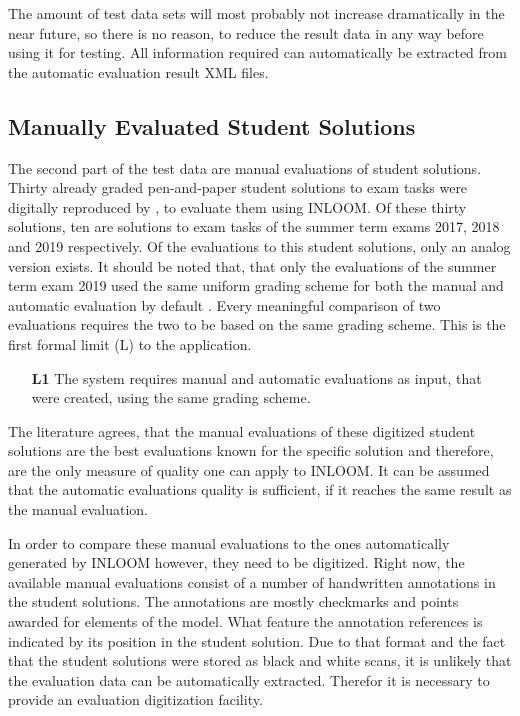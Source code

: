 The amount of test data sets will most probably not increase dramatically in the near future,
so there is no reason, to reduce the result data in any way before using it for testing. All
information required can automatically be extracted from the automatic evaluation result XML 
files.



\subsection{Manually Evaluated Student Solutions}

The second part of the test data are manual evaluations of student solutions. Thirty already
graded pen-and-paper student solutions to exam tasks were digitally reproduced by \cite{1}, to 
evaluate them using INLOOM. Of these thirty solutions, ten are solutions to exam tasks of the
summer term exams 2017, 2018 and 2019 respectively. Of the evaluations to this student solutions,
only an analog version exists. It should be noted that, that only the evaluations of the summer
term exam 2019 used the same uniform grading scheme for both the manual and automatic evaluation
by default \cite{1}. Every meaningful comparison of two evaluations requires the two to be 
based on the same grading scheme. This is the first formal limit (L) to the application.

\begin{itemize}
    \item[\textbf{L1}] The system requires manual and automatic evaluations as input, that were
    created, using the same grading scheme.
\end{itemize}

The literature agrees, that the manual evaluations of these digitized student solutions are 
the best evaluations known for the specific solution and therefore, are the only measure of 
quality one can apply to INLOOM. It can be assumed that the automatic evaluations quality is 
sufficient, if it reaches the same result as the manual evaluation. 

In order to compare these manual evaluations to the ones automatically generated by INLOOM 
however, they need to be digitized. Right now, the available manual evaluations consist of
a number of handwritten annotations in the student solutions. The annotations are mostly 
checkmarks and points awarded for elements of the model. What feature the annotation references
is indicated by its position in the student solution. Due to that format and the fact that the
student solutions were stored as black and white scans, it is unlikely that the evaluation data
can be automatically extracted. Therefor it is necessary to provide an evaluation digitization
facility.

